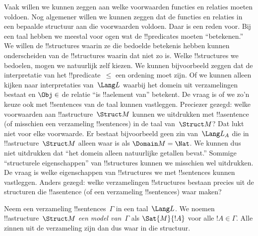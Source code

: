 \documentclass[openany]{memoir}
\begin{document}
\begin{explain}
Vaak willen we kunnen zeggen aan welke voorwaarden functies en
relaties moeten voldoen. Nog algemener willen we kunnen zeggen dat de
functies en relaties in een bepaalde structuur aan die voorwaarden
voldoen. Daar is een reden voor. Bij een taal hebben we meestal voor
ogen wat de !!{predicate}s moeten ``betekenen.'' We willen de
!!{structure}s waarin ze die bedoelde betekenis hebben kunnen
onderscheiden van de !!{structure}s waarin dat niet zo is.
Welke !!{structure}s we bedoelen, mogen we natuurlijk zelf kiezen. We
kunnen bijvoorbeeld zeggen dat de interpretatie van het
!!{predicate}~$\le$ een ordening moet zijn. Of we kunnen alleen kijken
naar interpretaties van~$\Lang L$ waarbij het domein uit verzamelingen
bestaat en $\Obj \in$ de relatie ``is !!a{element} van'' betekent. De
vraag is of we zo'n keuze ook met !!{sentence}s van de taal kunnen
vastleggen. Preciezer gezegd: welke voorwaarden aan
!!a{structure}~$\Struct M$ kunnen we uitdrukken met !!a{sentence} (of
misschien een verzameling !!{sentence}s) in de taal van~$\Struct M$?
Dat lukt niet voor elke voorwaarde. Er bestaat bijvoorbeeld geen zin
van~$\Lang L_A$ die in !!a{structure}~$\Struct M$ alleen waar is als
$\Domain M = \Nat$. We kunnen dus niet uitdrukken dat ``het domein
alleen natuurlijke getallen bevat.'' Sommige ``structurele
eigenschappen'' van !!{structure}s kunnen we misschien wel
uitdrukken. De vraag is welke eigenschappen van !!{structure}s we met
!!{sentence}s kunnen vastleggen. Anders gezegd: welke verzamelingen
!!{structure}s bestaan precies uit de structuren die !!a{sentence} (of
een verzameling !!{sentence}s) waar maken?
\end{explain}

\begin{defn}
Neem een verzameling !!{sentence}s~$\Gamma$ in een taal~$\Lang L$. We
noemen !!a{structure}~$\Struct M$ \emph{een model van}~$\Gamma$ als
$\Sat{M}{!A}$ voor alle $!A \in \Gamma$. Alle zinnen uit de verzameling
zijn dan dus waar in die structuur.
\end{defn}
\end{document}
